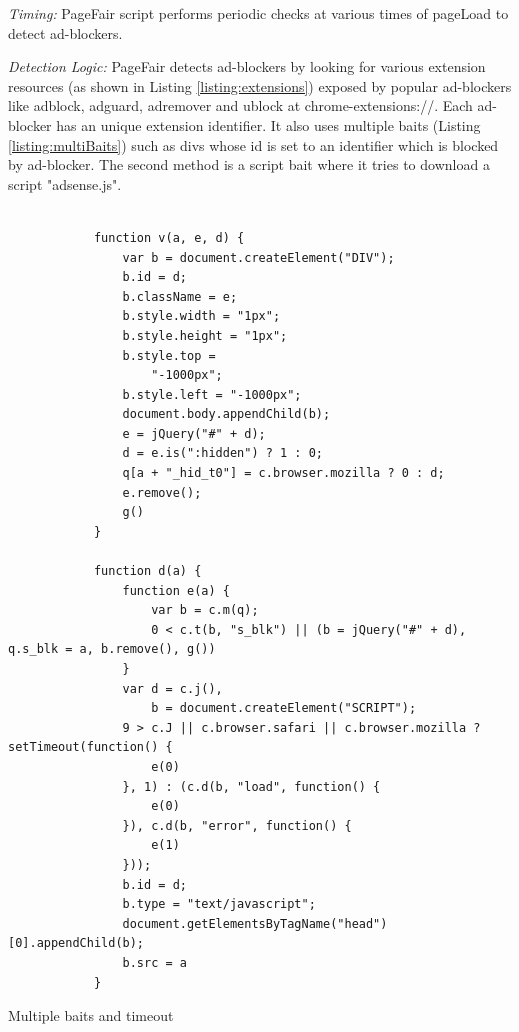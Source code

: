 \documentclass[runningheads,a4paper]{llncs}
\begin{document}
\textit{Timing:} PageFair script performs periodic checks at various times of pageLoad to detect ad-blockers.

\textit{Detection Logic:} PageFair detects ad-blockers by looking for various extension resources (as shown in Listing \ref{listing:extensions}) exposed by popular ad-blockers like adblock, adguard, adremover and ublock at chrome-extensions://. Each ad-blocker has an unique extension identifier. It also uses multiple baits (Listing \ref{listing:multiBaits}) such as divs whose id is set to an identifier which is blocked by ad-blocker. The second method is a script bait where it tries to download a script "adsense.js".

\begin{listing}[!b]
\begin{verbatim}
               
            function v(a, e, d) {
                var b = document.createElement("DIV");
                b.id = d;
                b.className = e;
                b.style.width = "1px";
                b.style.height = "1px";
                b.style.top =
                    "-1000px";
                b.style.left = "-1000px";
                document.body.appendChild(b);
                e = jQuery("#" + d);
                d = e.is(":hidden") ? 1 : 0;
                q[a + "_hid_t0"] = c.browser.mozilla ? 0 : d;
                e.remove();
                g()
            }

            function d(a) {
                function e(a) {
                    var b = c.m(q);
                    0 < c.t(b, "s_blk") || (b = jQuery("#" + d), q.s_blk = a, b.remove(), g())
                }
                var d = c.j(),
                    b = document.createElement("SCRIPT");
                9 > c.J || c.browser.safari || c.browser.mozilla ? setTimeout(function() {
                    e(0)
                }, 1) : (c.d(b, "load", function() {
                    e(0)
                }), c.d(b, "error", function() {
                    e(1)
                }));
                b.id = d;
                b.type = "text/javascript";
                document.getElementsByTagName("head")[0].appendChild(b);
                b.src = a
            }
\end{verbatim}
\caption{Multiple baits and timeout}
\label{listing:multiBaits}
\end{listing}
\end{document}
